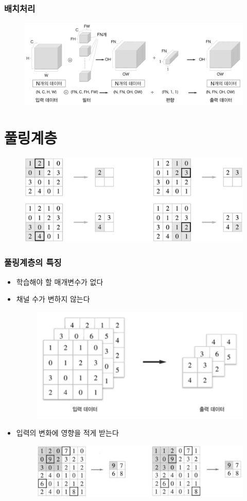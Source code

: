 \documentclass{beamer}
\begin{document}
\begin{frame}
	\frametitle{배치처리}
	\begin{figure}
		\includegraphics[width=1\columnwidth]{../Figure/Figure_9.pdf}
	\end{figure}
\end{frame}

\section{풀링계층}
\begin{frame}
	\begin{figure}
		\includegraphics[width=1\columnwidth]{../Figure/Figure_10.pdf}
	\end{figure}
\end{frame}

\begin{frame}
	\frametitle{풀링계층의 특징}
		\begin{itemize}
			\item 학습해야 할 매개변수가 없다
			\item 채널 수가 변하지 않는다
			\begin{figure}
				\includegraphics[width=0.5\columnwidth]{../Figure/Figure_11.pdf}
			\end{figure}
			\item 입력의 변화에 영향을 적게 받는다
			\begin{figure}
				\includegraphics[width=0.5\columnwidth]{../Figure/Figure_12.pdf}
			\end{figure}
		\end{itemize}
\end{frame}
\end{document}

